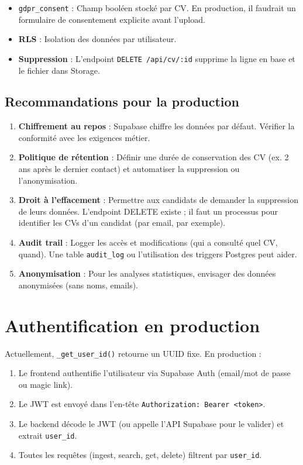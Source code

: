 \documentclass[11pt,a4paper]{report}
\begin{document}
\begin{itemize}[leftmargin=*]
  \item \texttt{gdpr\_consent} : Champ booléen stocké par CV. En production, il faudrait un formulaire de consentement explicite avant l'upload.
  \item \textbf{RLS} : Isolation des données par utilisateur.
  \item \textbf{Suppression} : L'endpoint \texttt{DELETE /api/cv/:id} supprime la ligne en base et le fichier dans Storage.
\end{itemize}

\subsection{Recommandations pour la production}

\begin{enumerate}[leftmargin=*]
  \item \textbf{Chiffrement au repos} : Supabase chiffre les données par défaut. Vérifier la conformité avec les exigences métier.
  \item \textbf{Politique de rétention} : Définir une durée de conservation des CV (ex. 2 ans après le dernier contact) et automatiser la suppression ou l'anonymisation.
  \item \textbf{Droit à l'effacement} : Permettre aux candidats de demander la suppression de leurs données. L'endpoint DELETE existe ; il faut un processus pour identifier les CVs d'un candidat (par email, par exemple).
  \item \textbf{Audit trail} : Logger les accès et modifications (qui a consulté quel CV, quand). Une table \texttt{audit\_log} ou l'utilisation des triggers Postgres peut aider.
  \item \textbf{Anonymisation} : Pour les analyses statistiques, envisager des données anonymisées (sans noms, emails).
\end{enumerate}

\section{Authentification en production}

Actuellement, \texttt{\_get\_user\_id()} retourne un UUID fixe. En production :

\begin{enumerate}[leftmargin=*]
  \item Le frontend authentifie l'utilisateur via Supabase Auth (email/mot de passe ou magic link).
  \item Le JWT est envoyé dans l'en-tête \texttt{Authorization: Bearer <token>}.
  \item Le backend décode le JWT (ou appelle l'API Supabase pour le valider) et extrait \texttt{user\_id}.
  \item Toutes les requêtes (ingest, search, get, delete) filtrent par \texttt{user\_id}.
\end{enumerate}
\end{document}
